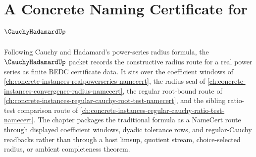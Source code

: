 \chapter{A Concrete Naming Certificate for $\CauchyHadamardUp$}
\label{ch:concrete-instances-cauchy-hadamard-namecert}

Following Cauchy and Hadamard's power-series radius formula, the $\CauchyHadamardUp$ packet records the constructive radius route for a real power series as finite BEDC certificate data. It sits over the coefficient windows of \autoref{ch:concrete-instances-realpowerseries-namecert}, the radius seal of \autoref{ch:concrete-instances-convergence-radius-namecert}, the regular root-bound route of \autoref{ch:concrete-instances-regular-cauchy-root-test-namecert}, and the sibling ratio-test comparison route of \autoref{ch:concrete-instances-regular-cauchy-ratio-test-namecert}. The chapter packages the traditional formula as a NameCert route through displayed coefficient windows, dyadic tolerance rows, and regular-Cauchy readbacks rather than through a host limsup, quotient stream, choice-selected radius, or ambient completeness theorem.

